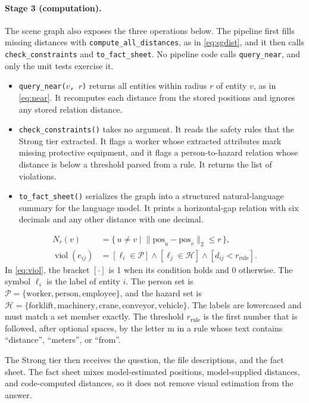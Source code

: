 \documentclass{article}
\begin{document}
\paragraph{Stage 3 (computation).}
The scene graph also exposes the three operations below. The pipeline first fills missing distances with \texttt{compute\_all\_distances}, as in \cref{eq:sgdist}, and it then calls \texttt{check\_constraints} and \texttt{to\_fact\_sheet}. No pipeline code calls \texttt{query\_near}, and only the unit tests exercise it.

\begin{itemize}[leftmargin=*,nosep]
  \item \texttt{query\_near($v$, $r$)} returns all entities within radius $r$ of entity $v$, as in \cref{eq:near}. It recomputes each distance from the stored positions and ignores any stored relation distance.
  \item \texttt{check\_constraints()} takes no argument. It reads the safety rules that the Strong tier extracted. It flags a worker whose extracted attributes mark missing protective equipment, and it flags a person-to-hazard relation whose distance is below a threshold parsed from a rule. It returns the list of violations.
  \item \texttt{to\_fact\_sheet()} serializes the graph into a structured natural-language summary for the language model. It prints a horizontal-gap relation with six decimals and any other distance with one decimal.
\end{itemize}
\begin{align}
  N_r(v) &= \{\, u \ne v \mid \lVert \text{pos}_u - \text{pos}_v \rVert_2 \le r \,\}, \label{eq:near}\\
  \operatorname{viol}(e_{ij}) &= [\ell_i \in \mathcal{P}] \wedge [\ell_j \in \mathcal{H}] \wedge [d_{ij} < r_{\text{rule}}]. \label{eq:viol}
\end{align}
In \cref{eq:viol}, the bracket $[\cdot]$ is 1 when its condition holds and 0 otherwise. The symbol $\ell_i$ is the label of entity $i$. The person set is $\mathcal{P} = \{\text{worker}, \text{person}, \text{employee}\}$, and the hazard set is $\mathcal{H} = \{\text{forklift}, \text{machinery}, \text{crane}, \text{conveyor}, \text{vehicle}\}$. The labels are lowercased and must match a set member exactly. The threshold $r_{\text{rule}}$ is the first number that is followed, after optional spaces, by the letter m in a rule whose text contains ``distance'', ``meters'', or ``from''.

The Strong tier then receives the question, the file descriptions, and the fact sheet. The fact sheet mixes model-estimated positions, model-supplied distances, and code-computed distances, so it does not remove visual estimation from the answer.
\end{document}
